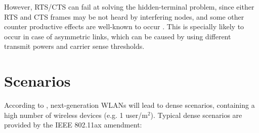 \documentclass[12pt, a4paper,twoside]{tesi_upf}
\begin{document}
			However, RTS/CTS can fail at solving the hidden-terminal problem, since either RTS and CTS frames may be not heard by interfering nodes, and some other counter productive effects are well-known to occur \cite{sobrinho2005rts}. This is specially likely to occur in case of asymmetric links, which can be caused by using different transmit powers and carrier sense thresholds.
					
		\section{Scenarios}
		\label{section:scenarios}	
		According to \cite{bellalta2016ieee}, next-generation WLANs will lead to dense scenarios, containing a high number of wireless devices (e.g. 1 user/m$^2$). Typical dense scenarios are provided by the IEEE 802.11ax amendment:
\end{document}
